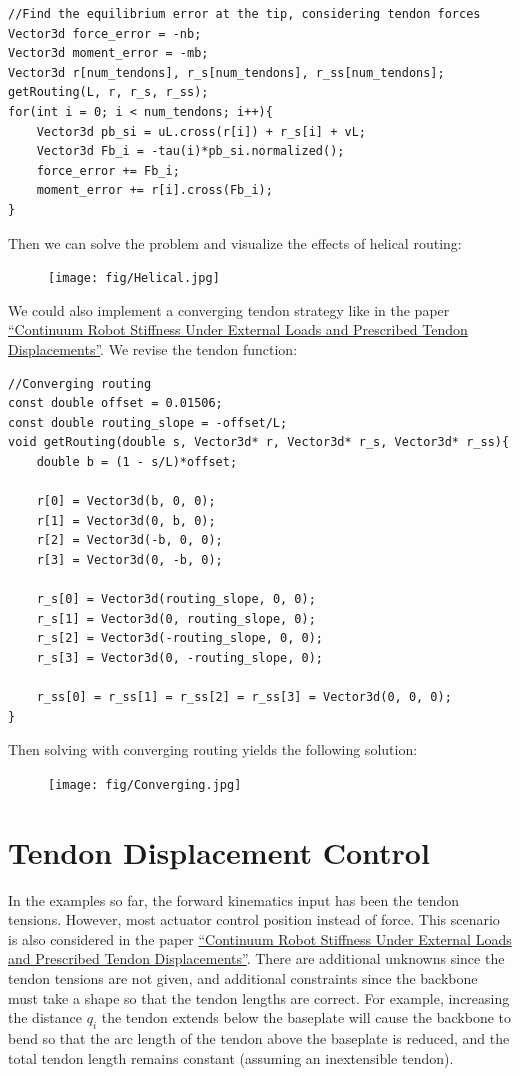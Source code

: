 \documentclass[12pt]{article}
\begin{document}
\begin{lstlisting}
//Find the equilibrium error at the tip, considering tendon forces
Vector3d force_error = -nb;
Vector3d moment_error = -mb;
Vector3d r[num_tendons], r_s[num_tendons], r_ss[num_tendons];
getRouting(L, r, r_s, r_ss);
for(int i = 0; i < num_tendons; i++){
    Vector3d pb_si = uL.cross(r[i]) + r_s[i] + vL;
    Vector3d Fb_i = -tau(i)*pb_si.normalized();
    force_error += Fb_i;
    moment_error += r[i].cross(Fb_i);
}
\end{lstlisting}
Then we can solve the problem and visualize the effects of helical routing:
\begin{figure}[h]
	\centering
		\texttt{[image: fig/Helical.jpg]}
\end{figure}

We could also implement a converging tendon strategy like in the paper \href{https://ieeexplore.ieee.org/document/8606257}{``Continuum Robot Stiffness Under External Loads and Prescribed Tendon Displacements''}. We revise the tendon function:
\begin{lstlisting}
//Converging routing
const double offset = 0.01506;
const double routing_slope = -offset/L;
void getRouting(double s, Vector3d* r, Vector3d* r_s, Vector3d* r_ss){
    double b = (1 - s/L)*offset;

    r[0] = Vector3d(b, 0, 0);
    r[1] = Vector3d(0, b, 0);
    r[2] = Vector3d(-b, 0, 0);
    r[3] = Vector3d(0, -b, 0);

    r_s[0] = Vector3d(routing_slope, 0, 0);
    r_s[1] = Vector3d(0, routing_slope, 0);
    r_s[2] = Vector3d(-routing_slope, 0, 0);
    r_s[3] = Vector3d(0, -routing_slope, 0);

    r_ss[0] = r_ss[1] = r_ss[2] = r_ss[3] = Vector3d(0, 0, 0);
}
\end{lstlisting}
Then solving with converging routing yields the following solution:
\begin{figure}[h]
	\centering
		\texttt{[image: fig/Converging.jpg]}
\end{figure}

\section{Tendon Displacement Control}

In the examples so far, the forward kinematics input has been the tendon tensions. However, most actuator control position instead of force. This scenario is also considered in the paper \href{https://ieeexplore.ieee.org/document/8606257}{``Continuum Robot Stiffness Under External Loads and Prescribed Tendon Displacements''}. There are additional unknowns since the tendon tensions are not given, and additional constraints since the backbone must take a shape so that the tendon lengths are correct. For example, increasing the distance $q_i$ the tendon extends below the baseplate will cause the backbone to bend so that the arc length of the tendon above the baseplate is reduced, and the total tendon length remains constant (assuming an inextensible tendon).
\end{document}
